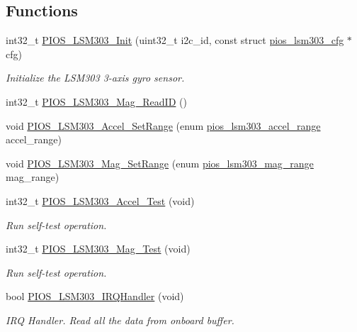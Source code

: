 \subsection*{\-Functions}
\begin{DoxyCompactItemize}
\item 
int32\-\_\-t \hyperlink{group___p_i_o_s___l_s_m303_ga14f9c78fed7bf58de8e69e585cd67769}{\-P\-I\-O\-S\-\_\-\-L\-S\-M303\-\_\-\-Init} (uint32\-\_\-t i2c\-\_\-id, const struct \hyperlink{structpios__lsm303__cfg}{pios\-\_\-lsm303\-\_\-cfg} $\ast$cfg)
\begin{DoxyCompactList}\small\item\em \-Initialize the \-L\-S\-M303 3-\/axis gyro sensor. \end{DoxyCompactList}\item 
int32\-\_\-t \hyperlink{group___p_i_o_s___l_s_m303_gae7f600d0c2cfc85affb21312eef1b4ce}{\-P\-I\-O\-S\-\_\-\-L\-S\-M303\-\_\-\-Mag\-\_\-\-Read\-I\-D} ()
\item 
void \hyperlink{group___p_i_o_s___l_s_m303_ga8b8011cf8463e2ae40eae82b2bf78251}{\-P\-I\-O\-S\-\_\-\-L\-S\-M303\-\_\-\-Accel\-\_\-\-Set\-Range} (enum \hyperlink{group___p_i_o_s___l_s_m303_gafbb0e59427f40a8d9b0e901af02bb7b3}{pios\-\_\-lsm303\-\_\-accel\-\_\-range} accel\-\_\-range)
\item 
void \hyperlink{group___p_i_o_s___l_s_m303_gae1c05338828d7ced47c189ed3e73a24a}{\-P\-I\-O\-S\-\_\-\-L\-S\-M303\-\_\-\-Mag\-\_\-\-Set\-Range} (enum \hyperlink{group___p_i_o_s___l_s_m303_ga24737af5b503329ca628b921e32ec8d8}{pios\-\_\-lsm303\-\_\-mag\-\_\-range} mag\-\_\-range)
\item 
int32\-\_\-t \hyperlink{group___p_i_o_s___l_s_m303_ga6cead4a99372061bc1b1a9a08a0eb183}{\-P\-I\-O\-S\-\_\-\-L\-S\-M303\-\_\-\-Accel\-\_\-\-Test} (void)
\begin{DoxyCompactList}\small\item\em \-Run self-\/test operation. \end{DoxyCompactList}\item 
int32\-\_\-t \hyperlink{group___p_i_o_s___l_s_m303_ga02c4d8ca4981e2ced505a7ea3bd13a72}{\-P\-I\-O\-S\-\_\-\-L\-S\-M303\-\_\-\-Mag\-\_\-\-Test} (void)
\begin{DoxyCompactList}\small\item\em \-Run self-\/test operation. \end{DoxyCompactList}\item 
bool \hyperlink{group___p_i_o_s___l_s_m303_gac6bc0a694ea85c9644a96c5558b75a7d}{\-P\-I\-O\-S\-\_\-\-L\-S\-M303\-\_\-\-I\-R\-Q\-Handler} (void)
\begin{DoxyCompactList}\small\item\em \-I\-R\-Q \-Handler. \-Read all the data from onboard buffer. \end{DoxyCompactList}\end{DoxyCompactItemize}


